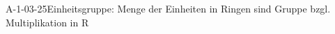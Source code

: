 
\begin{PROP}{A-1-03-25}{Einheitsgruppe: Menge der Einheiten in Ringen sind Gruppe bzgl. Multiplikation in R}
\end{PROP}
